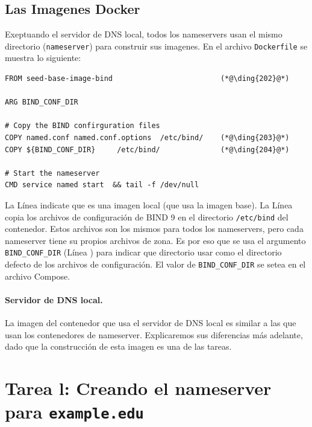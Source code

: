\subsection{Las Imagenes Docker} 

Exeptuando el servidor de DNS local, todos los nameservers usan el mismo directorio (\texttt{nameserver}) para construir sus imagenes. En el archivo \texttt{Dockerfile} se muestra lo siguiente:


\begin{lstlisting}
FROM seed-base-image-bind                         (*@\ding{202}@*)

ARG BIND_CONF_DIR

# Copy the BIND confirguration files
COPY named.conf named.conf.options  /etc/bind/    (*@\ding{203}@*)
COPY ${BIND_CONF_DIR}     /etc/bind/              (*@\ding{204}@*)

# Start the nameserver
CMD service named start  && tail -f /dev/null
\end{lstlisting}

La Línea  indicate que es una imagen local (que usa la imagen base).
La Línea  copia los archivos de configuración de BIND 9 en el directorio  \texttt{/etc/bind} del contenedor. Estos archivos son los mismos para todos los nameservers, pero cada nameserver tiene su propios archivos de zona. Es por eso que se usa el argumento \texttt{BIND\_CONF\_DIR} (Línea ) para indicar que directorio usar como el directorio defecto de los archivos de configuración. El valor de \texttt{BIND\_CONF\_DIR}  se setea en el archivo Compose.


\paragraph{Servidor de DNS local.}
La imagen del contenedor que usa el servidor de DNS local es similar a las que usan los contenedores de nameserver. Explicaremos sus diferencias más adelante, dado que la construcción de esta imagen es una de las tareas.


\section{Tarea l: Creando el nameserver para \texttt{example.edu}}

